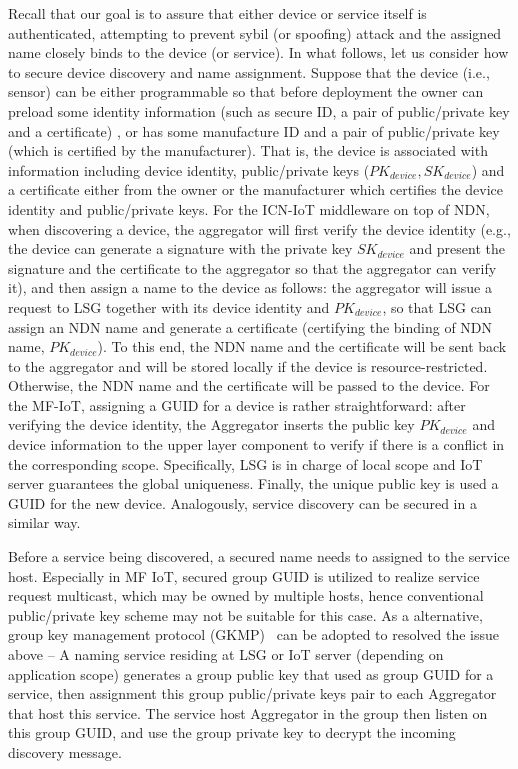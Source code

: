 Recall that our goal is to assure that either device or service itself is authenticated, attempting to prevent sybil (or spoofing) attack \cite{sybil} and the assigned name closely binds to the device (or service). In what follows, let us consider how to secure device discovery and name assignment. Suppose that the device (i.e., sensor) can be either programmable so that before deployment the owner can preload some identity information (such as secure ID, a pair of public/private key and a certificate) , or has some manufacture ID and a pair of public/private key (which is certified by the manufacturer). That is, the device is associated with information including device identity, public/private keys ($PK_{device}, SK_{device}$) and a certificate either from the owner or the manufacturer which certifies the device identity and public/private keys. For the ICN-IoT middleware on top of NDN, when discovering a device, the aggregator will first verify the device identity (e.g., the device can generate a signature with the private key $SK_{device}$ and present the signature and the certificate to the aggregator so that the aggregator can verify it), and then assign a name to the device as follows: the aggregator will issue a request to LSG together with its device identity and $PK_{device}$, so that LSG can assign an NDN name and generate a certificate (certifying the binding of NDN name, $PK_{device}$). To this end, the NDN name and the certificate will be sent back to the aggregator and will be stored locally if the device is resource-restricted. Otherwise, the NDN name and the certificate will be passed to the device. For the MF-IoT, assigning a GUID for a device is rather straightforward: after verifying the device identity, the Aggregator
inserts the public key $PK_{device}$ and device information to the upper layer component to verify if there is a conflict in the corresponding scope. Specifically, LSG is in charge of local scope and IoT server guarantees the global uniqueness. Finally, the unique public key is used a GUID for the new device. Analogously, service discovery can be secured in a similar way.

Before a service being discovered, a secured name needs to assigned to the service host. Especially in MF IoT, secured group GUID is utilized to realize service request multicast, which may be owned by multiple hosts, hence conventional public/private key scheme may not be suitable for this case. As a alternative, group key management protocol (GKMP)~\cite{harney1997group} can be adopted to resolved the issue above -- A naming service residing at LSG or IoT server (depending on application scope) generates a group public key that used as group GUID for a service, then assignment this group public/private keys pair to each Aggregator that host this service. The service host Aggregator in the group then listen on this group GUID, and use the group private key to decrypt the incoming discovery message.

